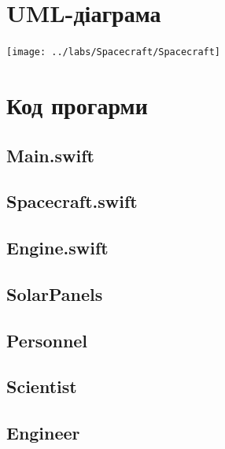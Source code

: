 \documentclass[a4paper,12pt]{article}
\begin{document}
\section{UML-діаграма}
\texttt{[image: ../labs/Spacecraft/Spacecraft]}
\newpage\section{Код прогарми}\subsection{Main.swift}


\subsection{Spacecraft.swift}

\subsection{Engine.swift}

\subsection{SolarPanels}

\subsection{Personnel}

\subsection{Scientist}

\subsection{Engineer}

\end{document}
